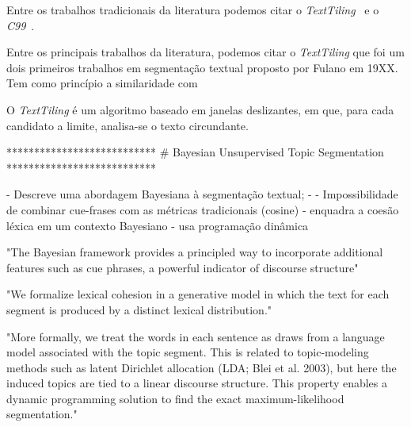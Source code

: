 



Entre os trabalhos tradicionais da literatura podemos citar o  \textit{TextTiling}~\cite{Hearst1994} e o \textit{C99}~\cite{Choi2000}. 

Entre os principais trabalhos da literatura, podemos citar o \textit{TextTiling} que foi um dois primeiros trabalhos em segmentação textual proposto por Fulano em 19XX. Tem como princípio a similaridade com


O \textit{TextTiling} é um algoritmo baseado em janelas deslizantes, em  que, para cada candidato a limite, analisa-se o texto circundante.






















***************************
# Bayesian Unsupervised Topic Segmentation
***************************

- Descreve uma abordagem Bayesiana à segmentação textual;
- 
- Impossibilidade de combinar cue-frases com as métricas tradicionais (cosine)
- {enquadra a coesão léxica em um contexto Bayesiano}
- usa programação dinâmica

"The Bayesian framework provides a principled way to incorporate additional features such as cue phrases, a powerful indicator of discourse structure"


"We formalize lexical cohesion in a generative model in which the text for each segment is produced by a distinct lexical distribution." 


"More formally, we treat the words in each sentence as draws from a language model associated with the topic segment. This is related to topic-modeling methods such as latent Dirichlet allocation (LDA; Blei et al. 2003), but here the induced topics are tied to a linear discourse structure. This property enables a dynamic programming solution to find the exact maximum-likelihood segmentation." 

